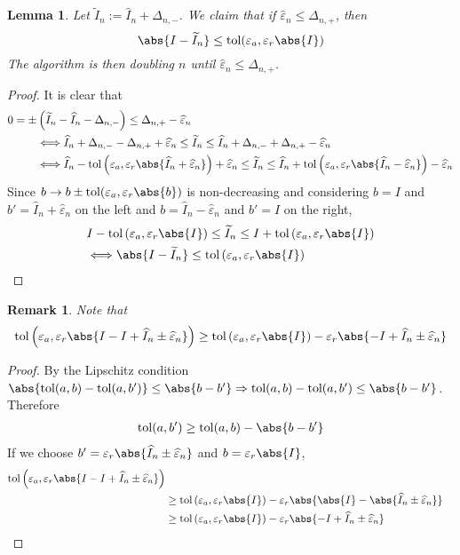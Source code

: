 \documentclass[]{elsarticle}
\newtheorem{lem}{Lemma}
\newtheorem{remark}{Remark}
\theoremstyle{definition}
\newcommand{\tol}{\text{tol}}
\begin{document}
\begin{lem}\label{first}
Let $\widetilde{I}_n:=\widehat{I}_n+\Delta_{n,-}$. We claim that if $\widehat{\varepsilon}_n\leq \Delta_{n,+}$, then
\[
\abs{I-\widetilde{I}_n}\leq \tol(\varepsilon_a,\varepsilon_r\abs{I})
\]
The algorithm is then doubling $n$ until $\widehat{\varepsilon}_n\leq \Delta_{n,+}$.
\end{lem}
\begin{proof}
It is clear that
\begin{align*}
0=\pm&\left(\widetilde{I}_n-\widehat{I}_n-\Delta_{n,-}\right)\leq \Delta_{n,+}-\widehat{\varepsilon}_n \\
&\Longleftrightarrow \widehat{I}_n+\Delta_{n,-} - \Delta_{n,+}+\widehat{\varepsilon}_n\leq \widetilde{I}_n \leq \widehat{I}_n+\Delta_{n,-}+ \Delta_{n,+}-\widehat{\varepsilon}_n\\
&\Longleftrightarrow \widehat{I}_n-\tol\left(\varepsilon_a,\varepsilon_r\abs{\widehat{I}_n+\widehat{\varepsilon}_n}\right)+\widehat{\varepsilon}_n\leq \widetilde{I}_n \leq \widehat{I}_n+\tol\left(\varepsilon_a,\varepsilon_r\abs{\widehat{I}_n-\widehat{\varepsilon}_n}\right)-\widehat{\varepsilon}_n
\end{align*}
Since $b\rightarrow b\pm \tol(\varepsilon_a,\varepsilon_r\abs{b})$ is non-decreasing and considering $b=I$ and $b'=\widehat{I}_n+\widehat{\varepsilon}_n$ on the left and $b=\widehat{I}_n-\widehat{\varepsilon}_n$ and $b'=I$ on the right,
\begin{align*}
&I-\tol\left(\varepsilon_a,\varepsilon_r\abs{I}\right)\leq \widetilde{I}_n  \leq I+\tol\left(\varepsilon_a,\varepsilon_r\abs{I}\right)\\
&\Longleftrightarrow \abs{I-\widetilde{I}_n}\leq\tol\left(\varepsilon_a,\varepsilon_r\abs{I}\right)
\end{align*}
\end{proof}

\begin{remark}
Note that
\[
\tol\left(\varepsilon_a,\varepsilon_r\abs{I-I+\widehat{I}_n\pm\widehat{\varepsilon}_n}\right)
\geq \tol\left(\varepsilon_a,\varepsilon_r\abs{I}\right)-\varepsilon_r\abs{-I+\widehat{I}_n\pm\widehat{\varepsilon}_n}
\]
\end{remark}
\begin{proof}
By the Lipschitz condition $\abs{\tol(a,b)-\tol(a,b')}\leq \abs{b-b'}\Rightarrow \tol(a,b)-\tol(a,b')\leq \abs{b-b'}$. Therefore
\begin{align*}
\tol(a,b')\geq\tol(a,b)-\abs{b-b'}
\end{align*}
If we choose $b'=\varepsilon_r\abs{\widehat{I}_n\pm\widehat{\varepsilon}_n}$ and $b=\varepsilon_r\abs{I}$,
\begin{align*}
\tol\left(\varepsilon_a,\varepsilon_r\abs{I-I+\widehat{I}_n\pm\widehat{\varepsilon}_n}\right)\\
&\geq \tol\left(\varepsilon_a,\varepsilon_r\abs{I}\right)-\varepsilon_r\abs{\abs{I}-\abs{\widehat{I}_n\pm\widehat{\varepsilon}_n}}\\
&\geq \tol\left(\varepsilon_a,\varepsilon_r\abs{I}\right)-\varepsilon_r\abs{-I+\widehat{I}_n\pm\widehat{\varepsilon}_n}
\end{align*}
\end{proof}
\end{document}
